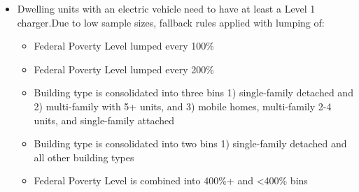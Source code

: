 \begin{itemize}
\item Dwelling units with an electric vehicle need to have at least a Level 1 charger.Due to low sample sizes, fallback rules applied with lumping of:
  \begin{itemize}
  \item [1] Federal Poverty Level lumped every 100\%
  \item [2] Federal Poverty Level lumped every 200\%
  \item [3] Building type is consolidated into three bins 1) single-family detached and 2) multi-family with 5+ units, and 3) mobile homes, multi-family 2-4 units, and single-family attached
  \item [4] Building type is consolidated into two bins 1) single-family detached and all other building types
  \item [5] Federal Poverty Level is combined into 400\%+ and <400\% bins
  \end{itemize}
\end{itemize}

